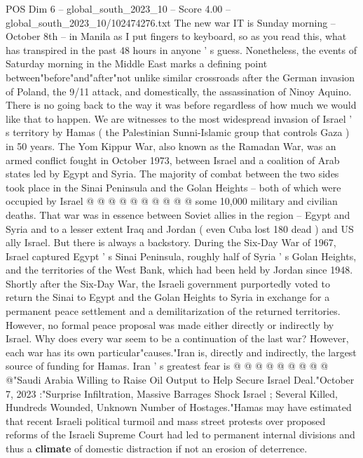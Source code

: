 \begin{textsample}{POS Dim 6 – global\_south\_2023\_10 – Score 4.00 – global\_south\_2023\_10/102474276.txt}  \label{ex:f6_pos_299}
The new war IT is Sunday morning -- October 8th -- in Manila as I put fingers to keyboard, so as you read this, what has transpired in the past 48 hours in anyone ' s guess.
Nonetheless, the events of Saturday morning in the Middle East marks a defining point between"before"and"after"not unlike similar crossroads after the German invasion of Poland, the 9/11 attack, and domestically, the assassination of Ninoy Aquino.
There is no going back to the way it was before regardless of how much we would like that to happen.
We are witnesses to the most widespread invasion of Israel ' s territory by Hamas ( the Palestinian Sunni-Islamic group that controls Gaza ) in 50 years.
The Yom Kippur War, also known as the Ramadan War, was an armed conflict fought in October 1973, between Israel and a coalition of Arab states led by Egypt and Syria.
The majority of combat between the two sides took place in the Sinai Peninsula and the Golan Heights -- both of which were occupied by Israel @ @ @ @ @ @ @ @ @ @ some 10,000 military and civilian deaths.
That war was in essence between Soviet allies in the region -- Egypt and Syria and to a lesser extent Iraq and Jordan ( even Cuba lost 180 dead ) and US ally Israel.
But there is always a backstory.
During the Six-Day War of 1967, Israel captured Egypt ' s Sinai Peninsula, roughly half of Syria ' s Golan Heights, and the territories of the West Bank, which had been held by Jordan since 1948.
Shortly after the Six-Day War, the Israeli government purportedly voted to return the Sinai to Egypt and the Golan Heights to Syria in exchange for a permanent peace settlement and a demilitarization of the returned territories.
However, no formal peace proposal was made either directly or indirectly by Israel.
Why does every war seem to be a continuation of the last war?
However, each war has its own particular"causes."Iran is, directly and indirectly, the largest source of funding for Hamas.
Iran ' s greatest fear is @ @ @ @ @ @ @ @ @ @"Saudi Arabia Willing to Raise Oil Output to Help Secure Israel Deal."October 7, 2023 :"Surprise Infiltration, Massive Barrages Shock Israel ; Several Killed, Hundreds Wounded, Unknown Number of Hostages."Hamas may have estimated that recent Israeli political turmoil and mass street protests over proposed reforms of the Israeli Supreme Court had led to permanent internal divisions and thus a \textbf{climate} of domestic distraction if not an erosion of deterrence.

\end{textsample}
